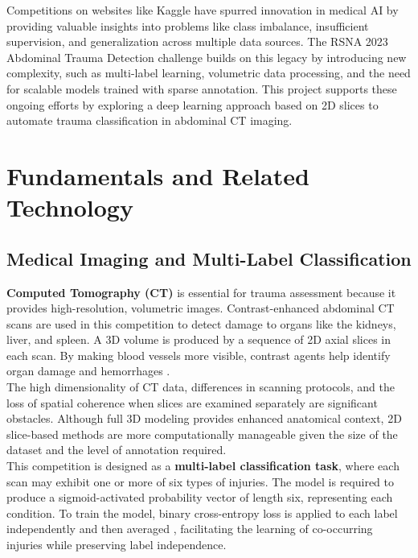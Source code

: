 \documentclass[a4paper,12pt]{article}
\begin{document}
Competitions on websites like Kaggle have spurred innovation in medical AI by providing valuable insights into problems like class imbalance, insufficient supervision, and generalization across multiple data sources. The RSNA 2023 Abdominal Trauma Detection challenge builds on this legacy by introducing new complexity, such as multi-label learning, volumetric data processing, and the need for scalable models trained with sparse annotation. This project supports these ongoing efforts by exploring a deep learning approach based on 2D slices to automate trauma classification in abdominal CT imaging.
\section{Fundamentals and Related Technology}
\subsection{Medical Imaging and Multi-Label Classification}
\textbf{Computed Tomography (CT)} is essential for trauma assessment because it provides high-resolution, volumetric images. Contrast-enhanced abdominal CT scans are used in this competition to detect damage to organs like the kidneys, liver, and spleen. A 3D volume is produced by a sequence of 2D axial slices in each scan. By making blood vessels more visible, contrast agents help identify organ damage and hemorrhages \cite{bosc2019computed}. \\

The high dimensionality of CT data, differences in scanning protocols, and the loss of spatial coherence when slices are examined separately are significant obstacles. Although full 3D modeling provides enhanced anatomical context, 2D slice-based methods are more computationally manageable given the size of the dataset and the level of annotation required. \\

This competition is designed as a \textbf{multi-label classification task}, where each scan may exhibit one or more of six types of injuries. The model is required to produce a sigmoid-activated probability vector of length six, representing each condition. To train the model, binary cross-entropy loss is applied to each label independently and then averaged \cite{zhang2014review}, facilitating the learning of co-occurring injuries while preserving label independence.
\end{document}
